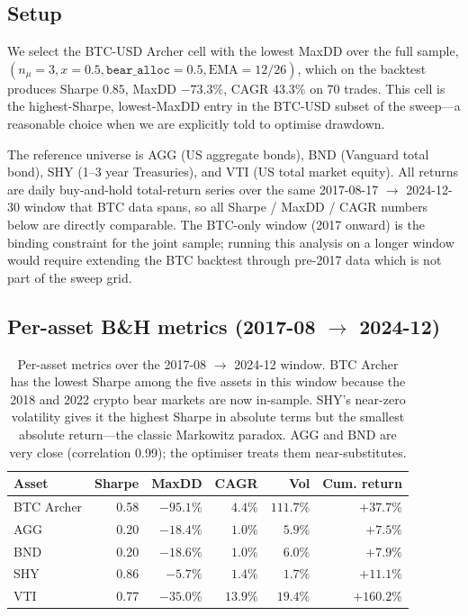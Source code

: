 \documentclass[11pt,a4paper]{article}
\begin{document}
\subsection{Setup}

We select the BTC-USD Archer cell with the lowest MaxDD over the full sample,
$(n_\mu=3, x=0.5, \mathtt{bear\_alloc}=0.5, \text{EMA}=12/26)$, which on the
backtest produces Sharpe $0.85$, MaxDD $-73.3\%$, CAGR $43.3\%$ on 70 trades.
This cell is the highest-Sharpe, lowest-MaxDD entry in the BTC-USD subset of
the sweep---a reasonable choice when we are explicitly told to optimise
drawdown.

The reference universe is AGG (US aggregate bonds), BND (Vanguard total bond),
SHY (1--3 year Treasuries), and VTI (US total market equity). All returns are
daily buy-and-hold total-return series over the same 2017-08-17 $\to$ 2024-12-30
window that BTC data spans, so all Sharpe / MaxDD / CAGR numbers below are
directly comparable. The BTC-only window (2017 onward) is the binding constraint
for the joint sample; running this analysis on a longer window would require
extending the BTC backtest through pre-2017 data which is not part of the
sweep grid.

\subsection{Per-asset B\&H metrics (2017-08 $\to$ 2024-12)}

\begin{table}[h!]
\centering
\small
\begin{tabular}{lrrrrr}
\toprule
\textbf{Asset} & \textbf{Sharpe} & \textbf{MaxDD} & \textbf{CAGR} & \textbf{Vol} & \textbf{Cum. return} \\
\midrule
BTC Archer & 0.58 & $-95.1\%$ & $4.4\%$ &  $111.7\%$ &  $+37.7\%$ \\
AGG       & 0.20 & $-18.4\%$ & $1.0\%$ &    $5.9\%$ &   $+7.5\%$ \\
BND       & 0.20 & $-18.6\%$ & $1.0\%$ &    $6.0\%$ &   $+7.9\%$ \\
SHY       & 0.86 & $-5.7\%$  & $1.4\%$ &    $1.7\%$ &  $+11.1\%$ \\
VTI       & 0.77 & $-35.0\%$ & $13.9\%$ &  $19.4\%$ & $+160.2\%$ \\
\bottomrule
\end{tabular}
\caption{Per-asset metrics over the 2017-08 $\to$ 2024-12 window. BTC Archer has the lowest Sharpe among the five assets in this window because the 2018 and 2022 crypto bear markets are now in-sample. SHY's near-zero volatility gives it the highest Sharpe in absolute terms but the smallest absolute return---the classic Markowitz paradox. AGG and BND are very close (correlation 0.99); the optimiser treats them near-substitutes.}
\end{table}
\end{document}

